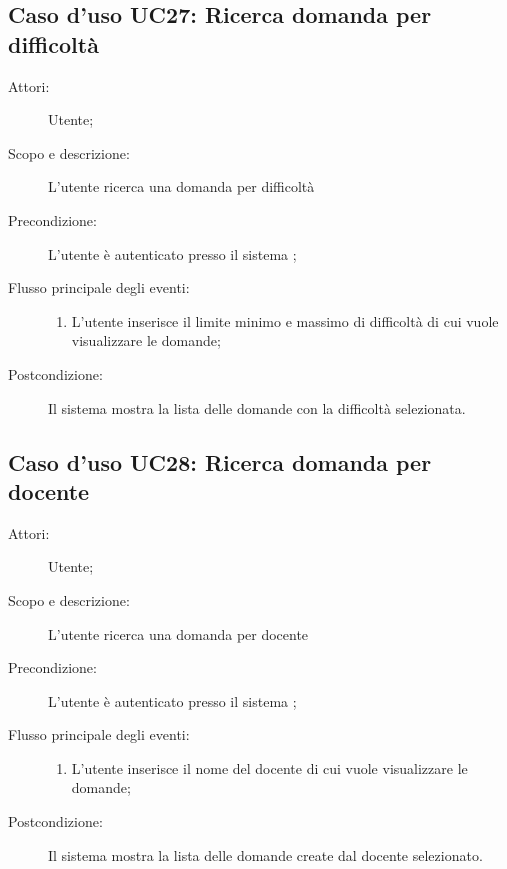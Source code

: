 \subsection{Caso d'uso UC27: Ricerca domanda per difficoltà}\begin{description}
\item[Attori:] Utente;
\item[Scopo e descrizione:] L'utente ricerca una domanda per difficoltà

      \item[Precondizione:] L'utente è autenticato presso il sistema
;

        \item[Flusso principale degli eventi:] \begin{enumerate}
          \item L'utente inserisce il limite minimo e massimo di difficoltà di cui vuole visualizzare le domande;

      \end{enumerate}
    \item[Postcondizione:] Il sistema mostra la lista delle domande con la difficoltà selezionata.
  \end{description}
\hypertarget{UC28}{}
\subsection{Caso d'uso UC28: Ricerca domanda per docente}\begin{description}
\item[Attori:] Utente;
\item[Scopo e descrizione:] L'utente ricerca una domanda per docente
      \item[Precondizione:] L'utente è autenticato presso il sistema
;

        \item[Flusso principale degli eventi:] \begin{enumerate}
          \item L'utente inserisce il nome del docente di cui vuole visualizzare le domande;

      \end{enumerate}
    \item[Postcondizione:] Il sistema mostra la lista delle domande create dal docente selezionato.
  \end{description}
\hypertarget{UC29}{}
